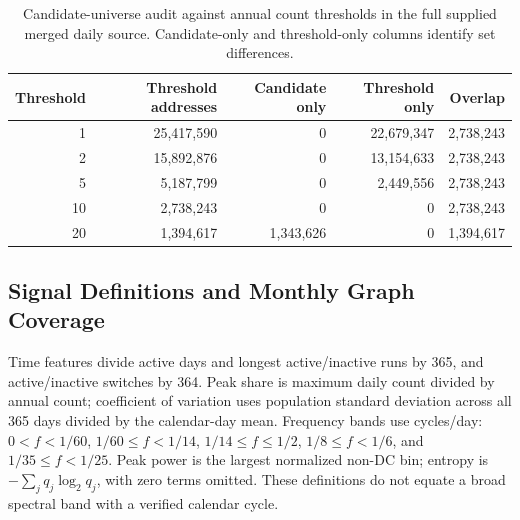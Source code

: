 \documentclass[journal,letterpaper]{IEEEtran}
\begin{document}
\begin{table}[t]
\centering\footnotesize
\caption{Candidate-universe audit against annual count thresholds in the full supplied merged daily source. Candidate-only and threshold-only columns identify set differences.}
\label{tab:suppcandidate}
\begin{tabular}{rrrrr}
\toprule
Threshold & Threshold addresses & Candidate only & Threshold only & Overlap \\
\midrule
1 & 25,417,590 & 0 & 22,679,347 & 2,738,243 \\
2 & 15,892,876 & 0 & 13,154,633 & 2,738,243 \\
5 & 5,187,799 & 0 & 2,449,556 & 2,738,243 \\
10 & 2,738,243 & 0 & 0 & 2,738,243 \\
20 & 1,394,617 & 1,343,626 & 0 & 1,394,617 \\
\bottomrule
\end{tabular}
\end{table}
\subsection{Signal Definitions and Monthly Graph Coverage}
Time features divide active days and longest active/inactive runs by 365, and active/inactive switches by 364. Peak share is maximum daily count divided by annual count; coefficient of variation uses population standard deviation across all 365 days divided by the calendar-day mean. Frequency bands use cycles/day: $0<f<1/60$, $1/60\le f<1/14$, $1/14\le f\le 1/2$, $1/8\le f<1/6$, and $1/35\le f<1/25$. Peak power is the largest normalized non-DC bin; entropy is $-\sum_j q_j\log_2 q_j$, with zero terms omitted. These definitions do not equate a broad spectral band with a verified calendar cycle.
\end{document}
